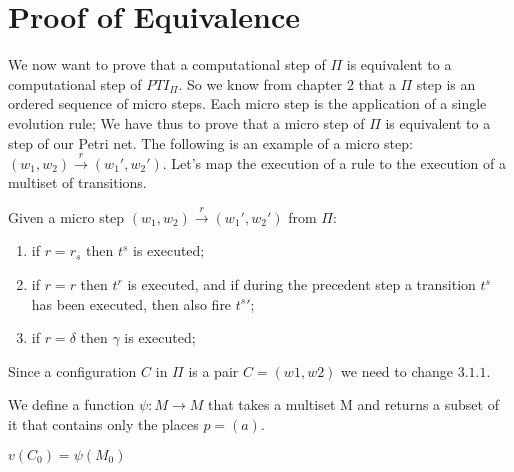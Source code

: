\chapter{Proof of Equivalence}

We now want to prove that a computational step of $\Pi$ is equivalent to a computational step of $PTI_\Pi$.
So we know from chapter 2 that a $\Pi$ step is an ordered sequence of micro steps.
Each micro step is the application of a single evolution rule;
We have thus to prove that a micro step of $\Pi$ is equivalent to a step of our Petri net.
The following is an example of a micro step: $(w_1,w_2) \xrightarrow{r} (w_1',w_2')$.
Let's map the execution of a rule to the execution of a multiset of transitions.

\begin{definition}
    Given a micro step $(w_1,w_2) \xrightarrow{r} (w_1',w_2')$ from $\Pi$:
    \begin{enumerate}
        \item if $r=r_s$ then $t^s$ is executed;
        \item if $r=r$ then $t^r$ is executed, and if during the precedent step a transition $t^s$ has been executed, then also fire $t^s'$;
        \item if $r=\delta$ then $\gamma$ is executed;
    \end{enumerate}
\end{definition}

Since a configuration $C$ in $\Pi$ is a pair $C=(w1,w2)$ we need to change \hyperref[def:map_conf]{$3.1.1$}.

\begin{definition}
We define a function $\psi: M \rightarrow M$ that takes a multiset M and returns a subset of it 
that contains only the places $p=(a)$.
\end{definition}

\begin{fact}[]
$v(C_0)=\psi(M_{0})$
\end{fact}
